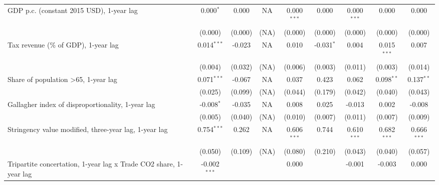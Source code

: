 \begin{table}[htbp]
\begin{tabular}{lcccccccc}
      GDP p.c. (constant 2015 USD), 1-year lag                          & 0.000$^{*}$    & 0.000                     & NA           & 0.000$^{***}$  & 0.000            & 0.000$^{***}$   & 0.000           & 0.000\\   
                                                                        & (0.000)        & (0.000)                   & (NA)         & (0.000)        & (0.000)          & (0.000)         & (0.000)         & (0.000)\\   
      Tax revenue (\% of GDP), 1-year lag                               & 0.014$^{***}$  & -0.023                    & NA           & 0.010          & -0.031$^{*}$     & 0.004           & 0.015$^{***}$   & 0.007\\   
                                                                        & (0.004)        & (0.032)                   & (NA)         & (0.006)        & (0.003)          & (0.011)         & (0.003)         & (0.014)\\   
      Share of population >65, 1-year lag                               & 0.071$^{***}$  & -0.067                    & NA           & 0.037          & 0.423            & 0.062           & 0.098$^{**}$    & 0.137$^{**}$\\   
                                                                        & (0.025)        & (0.099)                   & (NA)         & (0.044)        & (0.179)          & (0.042)         & (0.040)         & (0.043)\\   
      Gallagher index of disproportionality, 1-year lag                 & -0.008$^{*}$   & -0.035                    & NA           & 0.008          & 0.025            & -0.013          & 0.002           & -0.008\\   
                                                                        & (0.005)        & (0.040)                   & (NA)         & (0.010)        & (0.007)          & (0.011)         & (0.007)         & (0.009)\\   
      Stringency value modified, three-year lag, 1-year lag             & 0.754$^{***}$  & 0.262                     & NA           & 0.606$^{***}$  & 0.744            & 0.610$^{***}$   & 0.682$^{***}$   & 0.666$^{***}$\\   
                                                                        & (0.050)        & (0.109)                   & (NA)         & (0.080)        & (0.210)          & (0.043)         & (0.040)         & (0.057)\\   
      Tripartite concertation, 1-year lag x Trade CO2 share, 1-year lag & -0.002$^{***}$ &                           &              & 0.000          &                  & -0.001          & -0.003          & 0.000\\   

\end{tabular}
\end{table}
